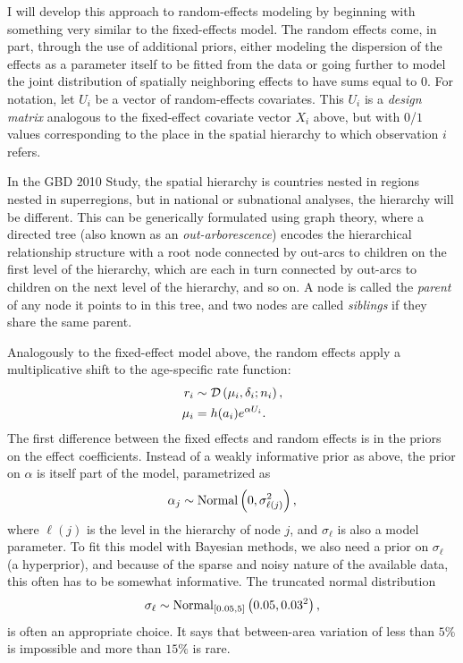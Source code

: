 I will develop this approach to random-effects modeling by beginning
with something very similar to the fixed-effects model.  The random
effects come, in part, through the use of additional priors, either
modeling the dispersion of the effects as a parameter itself to be
fitted from the data or going further to model the joint distribution of
spatially neighboring effects to have sums equal to $0$.  For
notation, let $U_i$ be a vector of random-effects covariates.  This
$U_i$ is a \emph{design matrix} analogous to the fixed-effect
covariate vector $X_i$ above, but with $0$/$1$ values corresponding
to the place in the spatial hierarchy to which observation $i$ refers.

In the GBD 2010 Study, the spatial hierarchy is countries nested in regions
nested in superregions, but in national or subnational analyses, the
hierarchy will be different. This can be generically formulated using
graph theory, where a directed tree (also known as an
\emph{out-arborescence}) encodes the hierarchical relationship
structure with a root node connected by out-arcs to children on the
first level of the hierarchy, which are each in turn connected by
out-arcs to children on the next level of the hierarchy, and so on.  A
node is called the \emph{parent} of any node it points to in this
tree, and two nodes are called \emph{siblings} if they share the same
parent.


Analogously to the fixed-effect model above, the random effects apply
a multiplicative shift to the age-specific rate function:
\begin{align*}
r_i &\sim \mathcal{D}\left(\mu_i, \delta_i; n_i\right),\\
\mu_i &= h(a_i)e^{\alpha U_i}.
\end{align*}
The first difference between the fixed effects and random effects is
in the priors on the effect coefficients.  Instead of a weakly
informative prior as above, the prior on $\alpha$ is itself part of
the model, parametrized as
\[
\alpha_j \sim \operatorname{Normal}\left(0, \sigma_{\ell(j)}^2\right),
\]
where $\ell(j)$ is the level in the hierarchy of node $j$, and
$\sigma_\ell$ is also a model parameter. To fit this model with
Bayesian methods, we also need a prior on $\sigma_\ell$ (a
hyperprior), and because of the sparse and noisy nature of the
available data, this often has to be somewhat informative.  The
truncated normal distribution
\[
\sigma_\ell \sim \operatorname{Normal}_{[0.05,5]}\left(0.05, 0.03^2\right),
\]
is often an appropriate choice. It says that between-area variation of
less than $5\%$ is impossible and more than $15\%$ is rare.

